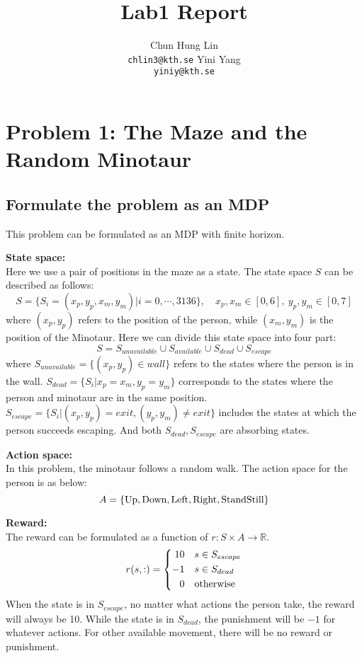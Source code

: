 \documentclass{article}
\title{Lab1 Report}
\author{
  Chun Hung Lin \\
  \texttt{chlin3@kth.se}
  \And
  Yini Yang \\
  \texttt{yiniy@kth.se}
}
\begin{document}
\maketitle

\section{Problem 1: The Maze and the Random Minotaur}
\subsection{Formulate the problem as an MDP}
This problem can be formulated as an MDP with finite horizon.
\newline

\textbf{State space:} \\
Here we use a pair of positions in the maze as a state. The state space $S$ can be described as follows:
$$S=\{S_i=(x_p,y_p,x_m,y_m)|i=0,\cdots,3136\}, \quad x_p,x_m\in [0,6],\  y_p,y_m\in [0,7]$$
where $(x_p,y_p)$ refers to the position of the person, while $(x_m,y_m)$ is the position of the Minotaur.
Here we can divide this state space into four part:
$$S=S_{unavailable}\cup S_{available}\cup S_{dead}\cup S_{escape}$$
where $S_{unavailable}=\{(x_p,y_p)\in wall\}$ refers to the states where the person is in the wall. 
$S_{dead}=\{S_i|x_p=x_m,y_p=y_m\}$ corresponds to the states where the person and minotaur are in the same position. 
$S_{escape}=\{S_i|(x_p,y_p)=exit,(y_p,y_m)\neq exit\}$ includes the states at which the person succeeds escaping.
And both $S_{dead}, S_{escape}$ are absorbing states.
\newline

\textbf{Action space:} \\
In this problem, the minotaur follows a random walk. The action space for the person is as below:
$$A=\{\textup{Up},\textup{Down},\textup{Left},\textup{Right},\textup{StandStill}\}$$
\newline

\textbf{Reward:} \\
The reward can be formulated as a function of $r: S\times A\rightarrow \mathbb{R}$.
$$r(s,:)=\left\{\begin{aligned}
 10 \quad &s\in S_{escape} \\
 -1 \quad &s\in S_{dead} \\
 0 \quad &\textup{otherwise}
\end{aligned}\right.$$
When the state is in $S_{escape}$, no matter what actions the person take, the reward will always be 10. 
While the state is in $S_{dead}$, the punishment will be $-1$ for whatever actions. 
For other available movement, there will be no reward or punishment.
\newline
\end{document}
